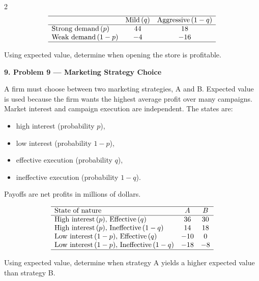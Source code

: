 \documentclass[12pt]{article}
\newcommand{\SubsectionBox}[1]{%
	\noindent\colorbox{gray!30}{%
		\parbox{\linewidth}{\textbf{#1}}%
	}\par\vspace{0.35cm}%
}
\begin{document}
\begin{multicols}{2}
				\[
				\begin{array}{lcc}
					\hline
					& \mbox{Mild}\,(q) & \mbox{Aggressive}\,(1-q) \\
					\hline
					\mbox{Strong demand}\,(p) & 44 & 18 \\
					\mbox{Weak demand}\,(1-p) & -4 & -16 \\
					\hline
				\end{array}
				\]
				
				Using expected value, determine when opening the store is profitable.

		\vspace{0.25cm}
		\SubsectionBox{9. Problem 9 --- Marketing Strategy Choice}\vspace{-0.25cm}
		A firm must choose between two marketing strategies, A and B. Expected value is used because the firm wants the highest average profit over many campaigns. Market interest and campaign execution are independent. The states are:
				\begin{itemize}
					\item high interest (probability \(p\)),
					\item low interest (probability \(1-p\)),
					\item effective execution (probability \(q\)),
					\item ineffective execution (probability \(1-q\)).
				\end{itemize}
				Payoffs are net profits in millions of dollars.
				
				\[
				\begin{array}{lcc}
					\hline
					\mbox{State of nature} & A & B \\
					\hline
					\mbox{High interest}\,(p),\,\mbox{Effective}\,(q) & 36 & 30 \\
					\mbox{High interest}\,(p),\,\mbox{Ineffective}\,(1-q) & 14 & 18 \\
					\mbox{Low interest}\,(1-p),\,\mbox{Effective}\,(q) & -10 & 0 \\
					\mbox{Low interest}\,(1-p),\,\mbox{Ineffective}\,(1-q) & -18 & -8 \\
					\hline
				\end{array}
				\]
				
				Using expected value, determine when strategy A yields a higher expected value than strategy B.


\end{multicols}
\end{document}

